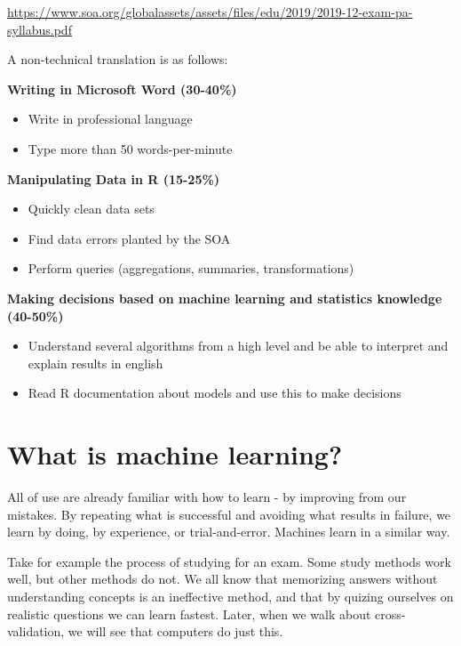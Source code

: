 \documentclass[]{book}
\providecommand{\tightlist}{%
  \setlength{\itemsep}{0pt}\setlength{\parskip}{0pt}}
\begin{document}
\url{https://www.soa.org/globalassets/assets/files/edu/2019/2019-12-exam-pa-syllabus.pdf}

A non-technical translation is as follows:

\textbf{Writing in Microsoft Word (30-40\%)}

\begin{itemize}
\tightlist
\item
  Write in professional language
\item
  Type more than 50 words-per-minute
\end{itemize}

\textbf{Manipulating Data in R (15-25\%)}

\begin{itemize}
\tightlist
\item
  Quickly clean data sets
\item
  Find data errors planted by the SOA
\item
  Perform queries (aggregations, summaries, transformations)
\end{itemize}

\textbf{Making decisions based on machine learning and statistics knowledge (40-50\%)}

\begin{itemize}
\tightlist
\item
  Understand several algorithms from a high level and be able to interpret and explain results in english
\item
  Read R documentation about models and use this to make decisions
\end{itemize}

\hypertarget{what-is-machine-learning}{%
\chapter{What is machine learning?}\label{what-is-machine-learning}}

All of use are already familiar with how to learn - by improving from our mistakes. By repeating what is successful and avoiding what results in failure, we learn by doing, by experience, or trial-and-error. Machines learn in a similar way.

Take for example the process of studying for an exam. Some study methods work well, but other methods do not. We all know that memorizing answers without understanding concepts is an ineffective method, and that by quizing ourselves on realistic questions we can learn fastest. Later, when we walk about cross-validation, we will see that computers do just this.
\end{document}
